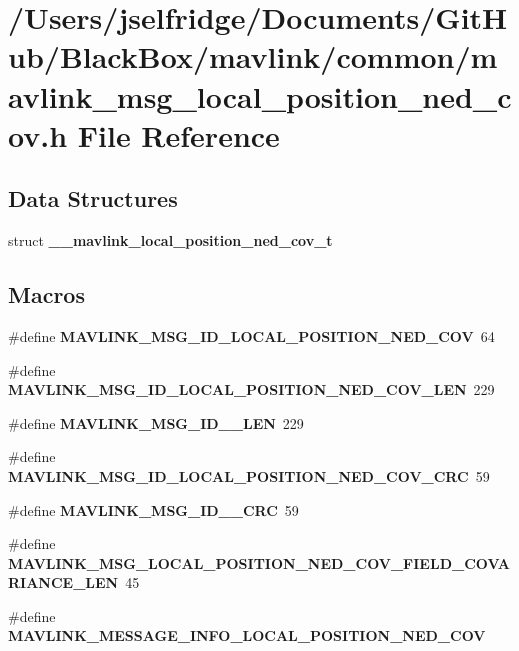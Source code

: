 \section{/\+Users/jselfridge/\+Documents/\+Git\+Hub/\+Black\+Box/mavlink/common/mavlink\+\_\+msg\+\_\+local\+\_\+position\+\_\+ned\+\_\+cov.h File Reference}
\label{mavlink__msg__local__position__ned__cov_8h}
\subsection*{Data Structures}
\begin{DoxyCompactItemize}
\item 
struct \textbf{ \+\_\+\+\_\+mavlink\+\_\+local\+\_\+position\+\_\+ned\+\_\+cov\+\_\+t}
\end{DoxyCompactItemize}
\subsection*{Macros}
\begin{DoxyCompactItemize}
\item 
\#define \textbf{ M\+A\+V\+L\+I\+N\+K\+\_\+\+M\+S\+G\+\_\+\+I\+D\+\_\+\+L\+O\+C\+A\+L\+\_\+\+P\+O\+S\+I\+T\+I\+O\+N\+\_\+\+N\+E\+D\+\_\+\+C\+OV}~64
\item 
\#define \textbf{ M\+A\+V\+L\+I\+N\+K\+\_\+\+M\+S\+G\+\_\+\+I\+D\+\_\+\+L\+O\+C\+A\+L\+\_\+\+P\+O\+S\+I\+T\+I\+O\+N\+\_\+\+N\+E\+D\+\_\+\+C\+O\+V\+\_\+\+L\+EN}~229
\item 
\#define \textbf{ M\+A\+V\+L\+I\+N\+K\+\_\+\+M\+S\+G\+\_\+\+I\+D\+\_\+\_\+\+L\+EN}~229
\item 
\#define \textbf{ M\+A\+V\+L\+I\+N\+K\+\_\+\+M\+S\+G\+\_\+\+I\+D\+\_\+\+L\+O\+C\+A\+L\+\_\+\+P\+O\+S\+I\+T\+I\+O\+N\+\_\+\+N\+E\+D\+\_\+\+C\+O\+V\+\_\+\+C\+RC}~59
\item 
\#define \textbf{ M\+A\+V\+L\+I\+N\+K\+\_\+\+M\+S\+G\+\_\+\+I\+D\+\_\+\_\+\+C\+RC}~59
\item 
\#define \textbf{ M\+A\+V\+L\+I\+N\+K\+\_\+\+M\+S\+G\+\_\+\+L\+O\+C\+A\+L\+\_\+\+P\+O\+S\+I\+T\+I\+O\+N\+\_\+\+N\+E\+D\+\_\+\+C\+O\+V\+\_\+\+F\+I\+E\+L\+D\+\_\+\+C\+O\+V\+A\+R\+I\+A\+N\+C\+E\+\_\+\+L\+EN}~45
\item 
\#define \textbf{ M\+A\+V\+L\+I\+N\+K\+\_\+\+M\+E\+S\+S\+A\+G\+E\+\_\+\+I\+N\+F\+O\+\_\+\+L\+O\+C\+A\+L\+\_\+\+P\+O\+S\+I\+T\+I\+O\+N\+\_\+\+N\+E\+D\+\_\+\+C\+OV}
\end{DoxyCompactItemize}
